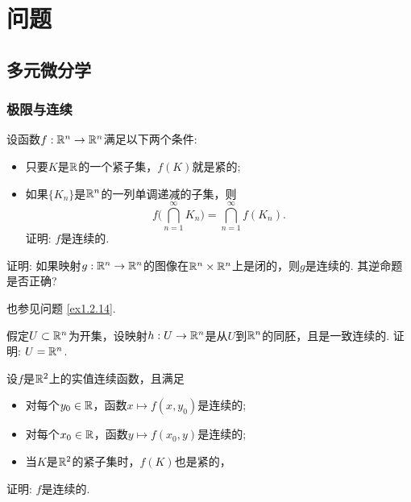 \documentclass[openany,usenames,dvipsnames]{ctexbook}
\begin{document}
\pagestyle{empty}

\frontmatter
\pagestyle{fancy}
\fancyhf{}
\cfoot{\thepage}
\fancyhead[RO,LE]{\rightmark}

\tableofcontents
\mainmatter

\part{问题}


\setcounter{chapter}{1}
\chapter{多元微分学}
\section{极限与连续}
\begin{example}
  设函数$f:\mathbb R^n\to\mathbb R^n$满足以下两个条件:
  \begin{itemize}
    \item 只要$K$是$\mathbb R$的一个紧子集，$f(K)$就是紧的;
    \item 如果$\{K_n\}$是$\mathbb R^n$的一列单调递减的子集，则
    \[ f\bigg( \bigcap_{n=1}^\infty K_n \bigg)
    =\bigcap_{n=1}^\infty f(K_n). \]
    证明: $f$是连续的.
  \end{itemize}
\end{example}

\begin{example}
  证明: 如果映射$g:\mathbb R^n\to\mathbb R^n$的图像在$\mathbb R^n\times\mathbb R^n$上是闭的，则$g$是连续的. 其逆命题是否正确?
\end{example}
\begin{note}
  也参见问题 \ref{ex1.2.14}.
\end{note}

\begin{example}
  假定$U\subset \mathbb R^n$为开集，设映射$h:U\to\mathbb R^n$是从$U$到$\mathbb R^n$的同胚，且是一致连续的. 证明: $U=\mathbb R^n$.
\end{example}

\begin{example}
  设$f$是$\mathbb R^2$上的实值连续函数，且满足
  \begin{itemize}
    \item 对每个$y_0\in\mathbb R$，函数$x\mapsto f(x,y_0)$是连续的;
    \item 对每个$x_0\in\mathbb R$，函数$y\mapsto f(x_0,y)$是连续的;
    \item 当$K$是$\mathbb R^2$的紧子集时，$f(K)$也是紧的，
  \end{itemize}
  证明: $f$是连续的.
\end{example}
\end{document}
